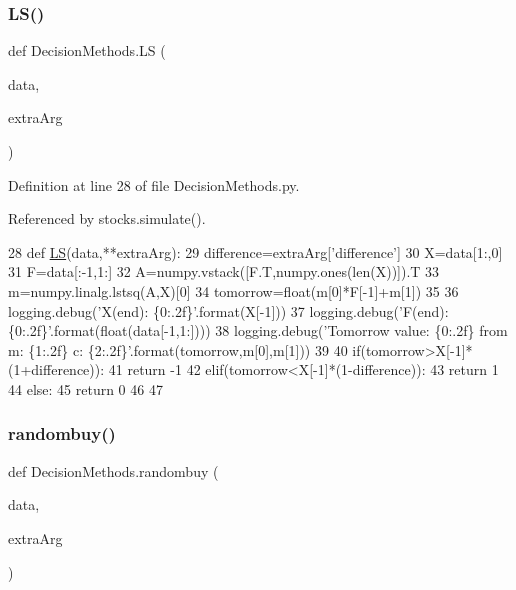 \subsubsection{\texorpdfstring{L\+S()}{LS()}}
{\footnotesize\ttfamily def Decision\+Methods.\+LS (\begin{DoxyParamCaption}\item[{}]{data,  }\item[{}]{extra\+Arg }\end{DoxyParamCaption})}



Definition at line 28 of file Decision\+Methods.\+py.



Referenced by stocks.\+simulate().


\begin{DoxyCode}
28 \textcolor{keyword}{def }\hyperlink{namespaceDecisionMethods_a856437b184fc8efd2df5f7fe1ba3644d}{LS}(data,**extraArg):
29     difference=extraArg[\textcolor{stringliteral}{'difference'}]
30     X=data[1:,0]
31     F=data[:-1,1:]
32     A=numpy.vstack([F.T,numpy.ones(len(X))]).T
33     m=numpy.linalg.lstsq(A,X)[0]
34     tomorrow=float(m[0]*F[-1]+m[1])
35 
36     logging.debug(\textcolor{stringliteral}{'X(end): \{0:.2f\}'}.format(X[-1]))
37     logging.debug(\textcolor{stringliteral}{'F(end): \{0:.2f\}'}.format(float(data[-1,1:])))
38     logging.debug(\textcolor{stringliteral}{'Tomorrow value: \{0:.2f\} from m: \{1:.2f\} c: \{2:.2f\}'}.format(tomorrow,m[0],m[1]))
39 
40     if(tomorrow>X[-1]*(1+difference)):
41         \textcolor{keywordflow}{return} -1
42     elif(tomorrow<X[-1]*(1-difference)):
43         \textcolor{keywordflow}{return} 1
44     \textcolor{keywordflow}{else}:
45         \textcolor{keywordflow}{return} 0
46 
47 
\end{DoxyCode}
\hypertarget{namespaceDecisionMethods_a44bd5be577a4d99d6b2d144ad405dd09}{}\label{namespaceDecisionMethods_a44bd5be577a4d99d6b2d144ad405dd09} 
\subsubsection{\texorpdfstring{randombuy()}{randombuy()}}
{\footnotesize\ttfamily def Decision\+Methods.\+randombuy (\begin{DoxyParamCaption}\item[{}]{data,  }\item[{}]{extra\+Arg }\end{DoxyParamCaption})}



